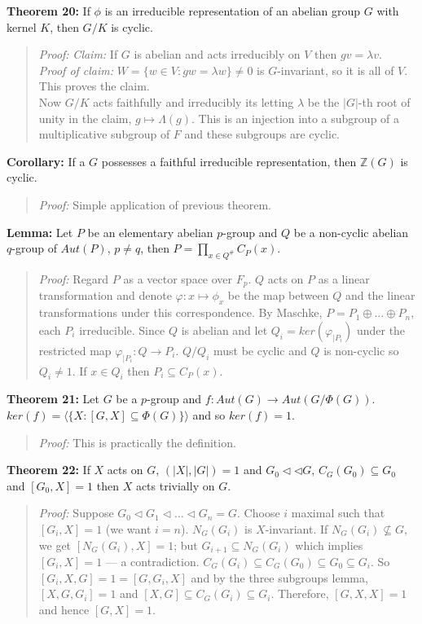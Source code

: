 {\bf Theorem 20:}
If $\phi$ is an irreducible representation of an abelian group $G$ with kernel $K$, then
$G/K$ is cyclic.
\begin{quote}
\emph{Proof:}  \emph{Claim:} If $G$ is abelian and acts irreducibly on $V$ then $gv= \lambda v$.\\
\emph{Proof of claim:}  $W= \{ w \in V: gw= \lambda w \} \ne 0$ is $G$-invariant,
so it is all of $V$.  This proves the claim.\\
Now $G/K$ acts faithfully and irreducibly its letting $\lambda$ be the
$|G|$-th root of unity in the claim, $g \mapsto \Lambda(g)$.  This is an injection into
a subgroup of a multiplicative subgroup of $F$ and these subgroups are cyclic.
\end{quote}
{\bf Corollary:}  If a $G$ possesses a faithful irreducible representation, then
${\mathbb Z}(G)$ is cyclic.
\begin{quote}
\emph{Proof:}  Simple application of previous theorem.
\end{quote}
{\bf Lemma:} Let $P$ be an elementary abelian $p$-group and $Q$ be a non-cyclic
abelian $q$-group of $Aut(P)$, $p \ne q$, then $P= \prod_{x \in Q^{\#}} C_P(x)$.
\begin{quote}
\emph{Proof:}  Regard $P$ as a vector space over $F_p$.  $Q$ acts on $P$ as a linear transformation
and denote $\varphi: x \mapsto \phi_x$ be the map between $Q$ and the linear transformations
under this correspondence.
By Maschke, $P= P_1 \oplus \ldots \oplus P_n$, each $P_i$ irreducible.  Since
$Q$ is abelian and let $Q_i= ker(\varphi_{|P_i})$ under the restricted map $\varphi_{|P_i}: Q \rightarrow P_i$.  $Q/Q_i$ must be cyclic and
$Q$ is non-cyclic so $Q_i \ne 1$.  If $x \in Q_i$ then $P_i \subseteq C_P(x)$.
\end{quote}
{\bf Theorem 21:}
Let $G$ be a $p$-group and
$f: Aut(G) \rightarrow Aut(G/\Phi(G))$.  $ker(f)= \langle \{ X: [G, X] \subseteq \Phi(G) \} \rangle$ and so $ker(f) = 1$.
\begin{quote}
\emph{Proof:}  This is practically the definition.
\end{quote}
{\bf Theorem 22:}
If $X$ acts on $G$, $(|X|, |G|)= 1$ and $G_0 \lhd \lhd G$, $C_G(G_0) \subseteq G_0$ and
$[G_0 , X] =1$ then $X$ acts trivially on $G$.
\begin{quote}
\emph{Proof:}  Suppose $G_0 \lhd G_1 \lhd \ldots \lhd G_n = G$.  Choose $i$ maximal such that
$[G_i, X]= 1$ (we want $i=n$).  $N_G(G_i)$ is $X$-invariant.  If
$N_G(G_i) \nsubseteq G$, we get $[N_G(G_i ), X]= 1$; but $G_{i+1} \subseteq N_G(G_i )$ which
implies $[G_i, X]= 1$ --- a contradiction.
$C_G(G_i ) \subseteq C_G(G_0) \subseteq G_0 \subseteq G_i$.
So $[G_i, X, G]=1= [G, G_i, X]$ and by the three subgroups lemma,
$[X,G,G_i]= 1$ and $[X,G] \subseteq C_G(G_i) \subseteq G_i$.
Therefore, $[G,X,X]=1$ and hence $[G,X]= 1$.
\end{quote}
